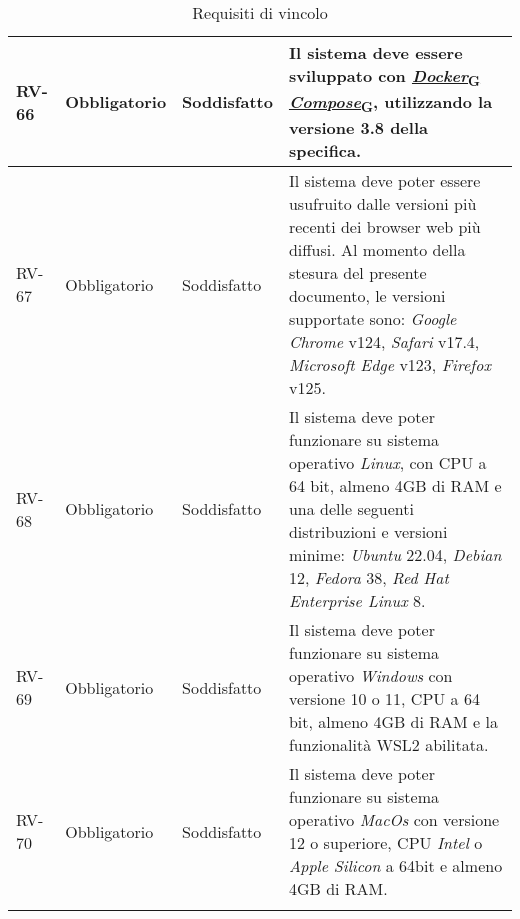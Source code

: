 \begin{longtable}{|>{\centering\arraybackslash}m{}|>{\centering\arraybackslash}m{}|>{\centering\arraybackslash}m{}|>{\centering\arraybackslash}m{}|}
	\\\hline
	RV-66           & Obbligatorio        & Soddisfatto                                                                                                           & Il sistema deve essere sviluppato con \href{https://7last.github.io/docs/pb/documentazione-interna/glossario\#docker-compose}{\href{https://7last.github.io/docs/pb/documentazione-interna/glossario\#docker}{\textit{Docker}\textsubscript{G}}\textit{ Compose}\textsubscript{G}}, utilizzando la versione 3.8 della specifica.
	\\\hline
	RV-67           & Obbligatorio        & Soddisfatto & Il sistema deve poter essere usufruito dalle versioni più recenti dei browser web più diffusi. Al momento della stesura del presente documento, le versioni supportate sono: \textit{Google Chrome} v124, \textit{Safari} v17.4, \textit{Microsoft Edge} v123, \textit{Firefox} v125.
	\\\hline
	RV-68           & Obbligatorio        & Soddisfatto                                                                                                           & Il sistema deve poter funzionare su sistema operativo \textit{Linux}, con CPU a 64 bit, almeno 4GB di RAM e una delle seguenti distribuzioni e versioni minime: \textit{Ubuntu} 22.04, \textit{Debian} 12, \textit{Fedora} 38, \textit{Red Hat Enterprise Linux} 8.
	\\\hline
	RV-69           & Obbligatorio        & Soddisfatto                                                                                                           & Il sistema deve poter funzionare su sistema operativo \textit{Windows} con versione 10 o 11, CPU a 64 bit, almeno 4GB di RAM e la funzionalità WSL2 abilitata.
	\\\hline
	RV-70           & Obbligatorio        & Soddisfatto                                                                                                           & Il sistema deve poter funzionare su sistema operativo \textit{MacOs} con versione 12 o superiore, CPU \textit{Intel} o \textit{Apple Silicon} a 64bit e almeno 4GB di RAM.
	\\\hline
	\caption{Requisiti di vincolo}
\end{longtable}

